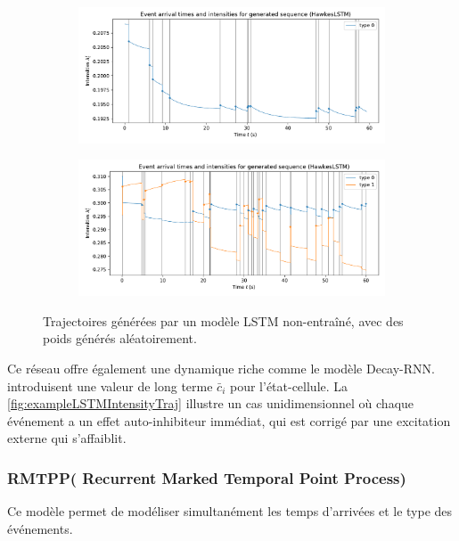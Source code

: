 \documentclass[../main.tex]{subfiles}
\begin{document}
\begin{figure}[!h]
	\begin{subfigure}{\linewidth}
		\includegraphics[width=\linewidth]{../notebooks/example_lstmplot.pdf}
	\end{subfigure}
	\begin{subfigure}{\linewidth}
		\includegraphics[width=\linewidth]{../notebooks/example_lstmplot2d.pdf}
	\end{subfigure}
	\caption{Trajectoires générées par un modèle LSTM non-entraîné, avec des poids générés aléatoirement.}\label{fig:exampleLSTMIntensityTraj}
\end{figure}

Ce réseau offre également une dynamique riche comme le modèle Decay-RNN. \citeauthor{meiEisnerNeuralHawkes} introduisent une valeur de long terme $\bar{c}_i$ pour l'état-cellule. La \autoref{fig:exampleLSTMIntensityTraj} illustre un cas unidimensionnel où chaque événement a un effet auto-inhibiteur immédiat, qui est corrigé par une excitation externe qui s'affaiblit.

\subsubsection{RMTPP( Recurrent Marked Temporal Point Process)}

Ce modèle permet de modéliser simultanément les temps d'arrivées et le type des événements.  
\end{document}
